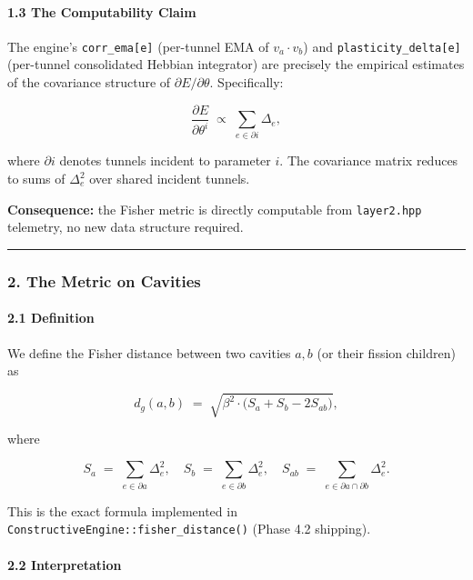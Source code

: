 \documentclass[
  11pt,
  a4paper,
]{article}
\begin{document}
\paragraph{1.3 The Computability Claim}\label{the-computability-claim}

The engine's \texttt{corr\_ema{[}e{]}} (per-tunnel EMA of
\(v_a \cdot v_b\)) and \texttt{plasticity\_delta{[}e{]}} (per-tunnel
consolidated Hebbian integrator) are precisely the empirical estimates
of the covariance structure of \(\partial E / \partial \theta\).
Specifically:

\[
\frac{\partial E}{\partial \theta^i} \;\propto\; \sum_{e \in \partial i} \Delta_e,
\]

where \(\partial i\) denotes tunnels incident to parameter \(i\). The
covariance matrix reduces to sums of \(\Delta_e^2\) over shared incident
tunnels.

\textbf{Consequence:} the Fisher metric is directly computable from
\texttt{layer2.hpp} telemetry, no new data structure required.

\begin{center}\rule{0.5\linewidth}{0.5pt}\end{center}

\subsubsection{2. The Metric on Cavities}\label{the-metric-on-cavities}

\paragraph{2.1 Definition}\label{definition}

We define the Fisher distance between two cavities \(a, b\) (or their
fission children) as

\[
d_g(a, b) \;=\; \sqrt{\beta^2 \cdot \big(S_a + S_b - 2 S_{ab}\big)},
\]

where

\[
S_a \;=\; \sum_{e \in \partial a} \Delta_e^2, \quad
S_b \;=\; \sum_{e \in \partial b} \Delta_e^2, \quad
S_{ab} \;=\; \sum_{e \in \partial a \cap \partial b} \Delta_e^2.
\]

This is the exact formula implemented in
\texttt{ConstructiveEngine::fisher\_distance()} (Phase 4.2 shipping).

\paragraph{2.2 Interpretation}\label{interpretation}
\end{document}

